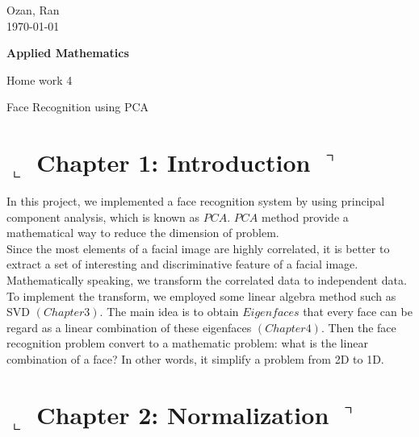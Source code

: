 \documentclass[]{article}
\title{}
\author{Ozan, Ran}
\begin{document}
 

\begin{flushright}
Ozan, Ran\\
\today\\
\end{flushright}

\centerline{ \Huge  \textbf{Applied Mathematics} }
\centerline{\Large  Home work 4}
\centerline{\Large  Face Recognition using PCA}


\section*{ $\llcorner$  Chapter 1: Introduction $\urcorner$}

In this project, we implemented a face recognition system by using principal component analysis, which is known as $ PCA $. $ PCA $ method provide a mathematical way to reduce the dimension of problem. 
\\

Since the most elements of a facial image are highly correlated, it is better to extract a set of interesting and discriminative feature of a facial image. Mathematically speaking, we transform the correlated data to independent data. To implement the transform, we employed some linear algebra method such as SVD $ (Chapter 3) $. The main idea is to obtain $ Eigenfaces $ that every face can be regard as a linear combination of these eigenfaces $ (Chapter 4) $. Then the face recognition problem convert to a mathematic problem: what is the linear combination of a face? In other words, it simplify a problem from 2D to 1D.

\section*{ $\llcorner$  Chapter 2: Normalization $\urcorner$}
\end{document}
